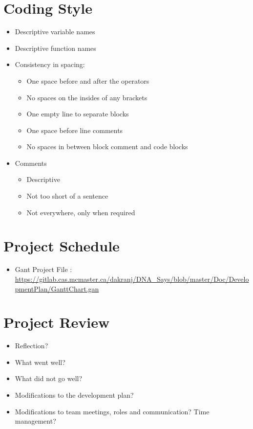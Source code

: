 \documentclass{article}
\begin{document}
\section{Coding Style}
\begin{itemize}
\item Descriptive variable names
\item Descriptive function names
\item Consistency in spacing:
\begin{itemize}
\item One space before and after the operators
\item No spaces on the insides of any brackets
\item One empty line to separate blocks
\item One space before line comments
\item No spaces in between block comment and code blocks
\end{itemize}
\item Comments
\begin{itemize}
\item Descriptive
\item Not too short of a sentence
\item Not everywhere, only when required
\end{itemize}
\end{itemize}
\section{Project Schedule}
\begin{itemize}
\item Gant Project File :
\url{https://gitlab.cas.mcmaster.ca/dakranj/DNA_Says/blob/master/Doc/DevelopmentPlan/GanttChart.gan}
\end{itemize}
\section{Project Review}
\begin{itemize}
\item Reflection?
\item What went well?
\item  What did not go well?
\item Modifications to the development plan?
\item Modifications to team meetings, roles and communication? Time management?
\end{itemize}
\end{document}
